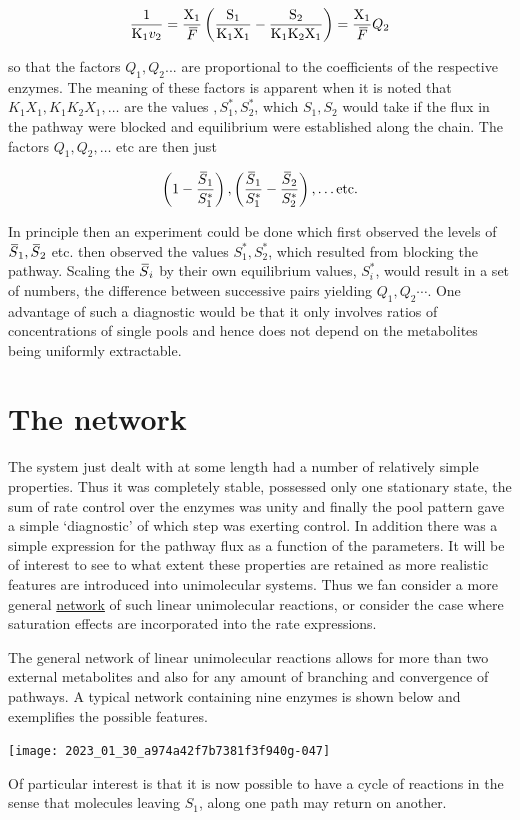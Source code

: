 $$\frac{1}{\mathrm{K}_1 v_2} = \frac{\mathrm{X}_1}{\,\overline{\!{F}}} \left(\frac{\mathrm{S}_1}{\mathrm{K}_1 \mathrm{X}_1}-\frac{\mathrm{S}_2}{\mathrm{K}_1 \mathrm{K}_2 \mathrm{X}_1}\right) = \frac{\mathrm{X}_1}{\,\overline{\!{F}}}  {Q}_2$$

so that the factors $Q_{1}, Q_{2}...$ are proportional to the coefficients of the respective enzymes. The meaning of these factors is apparent when it is noted that $K_{1} X_{1}, K_{1} K_{2} X_{1}, \ldots$ are the values $, S_{1}^{*}, S_{2}^{*}$, which $S_{1}, S_{2}$ would take if the flux in the pathway were blocked and equilibrium were established along the chain. The factors $Q_{1}, Q_{2}, \ldots$ etc are then just

$$\left(1-\frac{\,\overline{\!{S}}_{1}}{S_{1}^{*}}\right), \left(\frac{\,\overline{\!{S}}_{1}}{S_{1}^{*}} - \frac{\,\overline{\!{S}}_{2}}{S_{2}^{*}}\right), \ldots \mbox{etc.} $$

In principle then an experiment could be done which first observed the levels of $\,\overline{\!{S}}_{1}, \,\overline{\!{S}}_{2}$ etc. then observed the values $S_{1}^{*}, S_{2}^{*}$, which resulted from blocking the pathway. Scaling the $\,\overline{\!{S}}_{i}$ by their own equilibrium values, $S_{i}^{*}$, would result in a set of numbers, the difference between successive pairs yielding $Q_{1}, Q_{2} \cdots$. One advantage of such a diagnostic would be that it only involves ratios of concentrations of single pools and hence does not depend on the metabolites being uniformly extractable.

\section{The network}

The system just dealt with at some length had a number of relatively simple properties. Thus it was completely stable, possessed only one stationary state, the sum of rate control over the enzymes was unity and finally the pool pattern gave a simple `diagnostic' of which step was exerting control. In addition there was a simple expression for the pathway flux as a function of the parameters. It will be of interest to see to what extent these properties are retained as more realistic features are introduced into unimolecular systems. Thus we fan consider a more general \underline{network} of such linear unimolecular reactions, or consider the case where saturation effects are incorporated into the rate expressions.

The general network of linear unimolecular reactions allows for more than two external metabolites and also for any amount of branching and convergence of pathways. A typical network containing nine enzymes is shown below and exemplifies the possible features.
%
\begin{center}
\texttt{[image: 2023\_01\_30\_a974a42f7b7381f3f940g-047]}
\end{center}
%
Of particular interest is that it is now possible to have a cycle of reactions in the sense that molecules leaving $S_{1}$, along one path may return on another.

